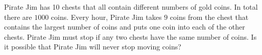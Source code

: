 Pirate Jim has 10 chests that all contain different numbers of gold coins. In total there are $1000$ coins. Every hour, Pirate Jim takes $9$ coins from the chest that contains the largest number of coins and puts one coin into each of the other chests. Pirate Jim must stop if any two chests have the same number of coins. Is it possible that Pirate Jim will never stop moving coins?
